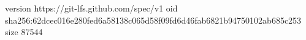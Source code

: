 version https://git-lfs.github.com/spec/v1
oid sha256:62dcec016e280fed6a58138c065d58f09fd6d46fab6821b94750102ab685c253
size 87544
